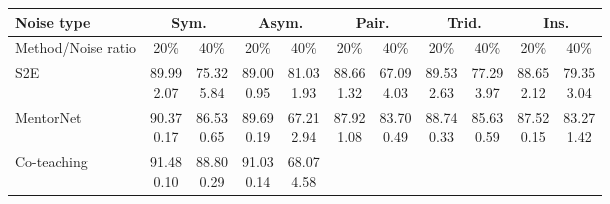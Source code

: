 \documentclass[11pt]{article}
\begin{document}
\begin{table}[!t]
    \small
\centering
	\begin{tabular}{l |cc|cc|cc|cc|cc} 
		\Xhline{3\arrayrulewidth}	 	
		   Noise type &\multicolumn{2}{c|}{Sym.}&\multicolumn{2}{c|}{Asym.}&\multicolumn{2}{c|}{Pair.}&\multicolumn{2}{c|}{Trid.}&\multicolumn{2}{c}{Ins.}\\
			\hline
		   Method/Noise ratio&  20\% & 40\%& 20\% & 40\% &20\% & 40\%& 20\% & 40\% & 20\% & 40\%\\
			\hline
			S2E& \makecell{89.99\\ \scriptsize{2.07}}
			& \makecell{75.32\\ \scriptsize{5.84}}
			& \makecell{89.00\\ \scriptsize{0.95}}
			& \makecell{81.03\\ \scriptsize{1.93}}
			& \makecell{88.66\\ \scriptsize{1.32}}
			& \makecell{67.09\\ \scriptsize{4.03}}
			& \makecell{89.53\\ \scriptsize{2.63}}
			& \makecell{77.29\\ \scriptsize{3.97}}
			& \makecell{88.65\\ \scriptsize{2.12}}
			& \makecell{79.35\\ \scriptsize{3.04}}\\
			\hline
			MentorNet & \makecell{90.37\\ \scriptsize{0.17}}
			& \makecell{86.53\\ \scriptsize{0.65}}
			& \makecell{89.69\\ \scriptsize{0.19}}
			& \makecell{67.21\\ \scriptsize{2.94}}
			& \makecell{87.92\\ \scriptsize{1.08}}
			& \makecell{83.70\\ \scriptsize{0.49}}
			& \makecell{88.74\\ \scriptsize{0.33}}
			& \makecell{85.63\\ \scriptsize{0.59}}
			& \makecell{87.52\\ \scriptsize{0.15}}
			& \makecell{83.27\\ \scriptsize{1.42}}\\
			\hline
			Co-teaching & \makecell{91.48\\ \scriptsize{0.10}}
			& \makecell{88.80\\ \scriptsize{0.29}}
			& \makecell{91.03\\ \scriptsize{0.14}}
			& \makecell{68.07\\ \scriptsize{4.58}}

\end{tabular}
\end{table}
\end{document}

